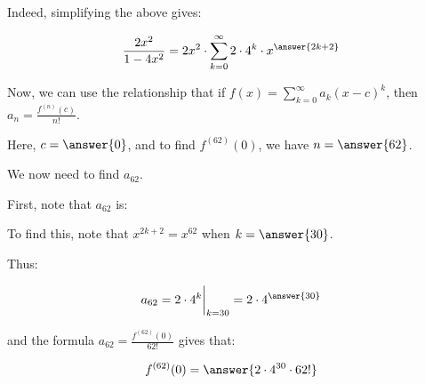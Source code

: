 \documentclass{ximera}
\begin{document}
\begin{exercise}
\begin{exercise}
Indeed, simplifying the above gives:

\[
\frac{2x^2}{1-4x^2} = 2x^2 \cdot  \sum_{k=0}^{\infty} 2\cdot 4^k \cdot  x^{\answer{2k+2}}
\]


\begin{exercise}
Now, we can use the relationship that if $f(x) = \sum_{k=0}^{\infty} a_k(x-c)^k$, then $a_n = \frac{f^{(n)}(c)}{n!}$.

Here, $c= \answer{0}$, and to find $f^{(62)}(0)$, we have $n=\answer{62}$. 

We now need to find $a_{62}$.

\begin{exercise}
First, note that $a_{62}$ is:
\begin{multipleChoice}
\end{multipleChoice}

To find this, note that $x^{2k+2} = x^{62}$ when $k=\answer{30}$.  

\begin{exercise}
Thus:

\[
a_{62} = 2 \cdot 4^{k} \bigg|_{k=30} = 2 \cdot 4^{\answer{30}}
\]

and the formula $a_{62} = \frac{f^{(62)}(0)}{62!}$ gives that:

\[
f^{(62)}(0) = \answer{2 \cdot 4^{30} \cdot 62!}
\]
\end{exercise}


\end{exercise}

\end{exercise}

\end{exercise}
\end{exercise}
\end{document}
